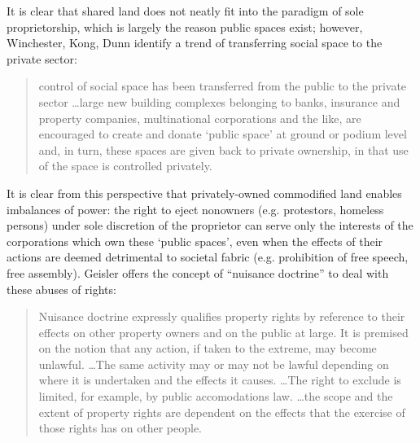 \documentclass[12pt, letterpaper, oneside]{article}
\begin{document}
It is clear that shared land does not neatly fit into the paradigm of sole proprietorship, which is largely the reason public spaces exist; however, Winchester, Kong, Dunn identify a trend of transferring social space to the private sector:
\begin{quote}
control of social space has been transferred from the public to the private sector \ldots large new building complexes belonging to banks, insurance and property companies, multinational corporations and the like, are encouraged to create and donate `public space' at ground or podium level and, in turn, these spaces are given back to private ownership, in that use of the space is controlled privately.

\autocite{winchester2013landscapes}
\end{quote}
It is clear from this perspective that privately-owned commodified land enables imbalances of power: the right to eject nonowners (e.g. protestors, homeless persons) under sole discretion of the proprietor can serve only the interests of the corporations which own these `public spaces', even when the effects of their actions are deemed detrimental to societal fabric (e.g. prohibition of free speech, free assembly). Geisler offers the concept of ``nuisance doctrine'' to deal with these abuses of rights:
\begin{quote}
Nuisance doctrine expressly qualifies property rights by reference to their effects on other property owners and on the public at large. It is premised on the notion that any action, if taken to the extreme, may become unlawful. \ldots The same activity may or may not be lawful depending on where it is undertaken and the effects it causes. \ldots The right to exclude is limited, for example, by public accomodations law. \ldots the scope and the extent of property rights are dependent on the effects that the exercise of those rights has on other people.

\autocite{geisler2000property}
\end{quote}
\end{document}
